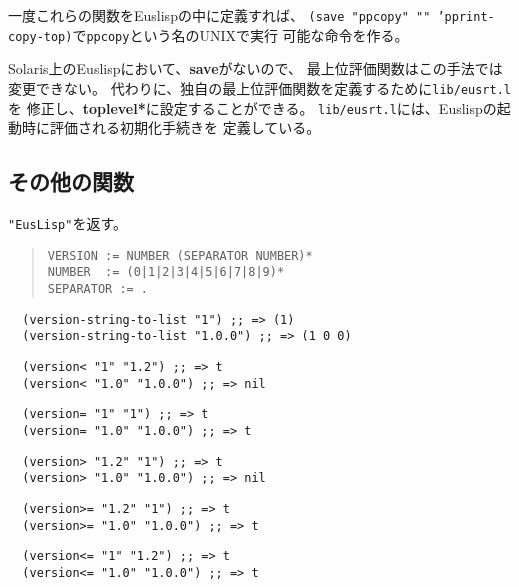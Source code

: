 一度これらの関数をEuslispの中に定義すれば、
{\tt (save "ppcopy" "" 'pprint-copy-top)}で{\tt ppcopy}という名のUNIXで実行
可能な命令を作る。

Solaris上のEuslispにおいて、{\bf save}がないので、
最上位評価関数はこの手法では変更できない。
代わりに、独自の最上位評価関数を定義するために{\tt lib/eusrt.l}を
修正し、{\bf *toplevel*}に設定することができる。
{\tt lib/eusrt.l}には、Euslispの起動時に評価される初期化手続きを
定義している。

\subsection{その他の関数}
\begin{refdesc}
{{\tt "EusLisp"}を返す。}
\begin{quote}
\begin{verbatim}
VERSION := NUMBER (SEPARATOR NUMBER)*
NUMBER  := (0|1|2|3|4|5|6|7|8|9)*
SEPARATOR := .
\end{verbatim}
\end{quote}
\begin{verbatim}
  (version-string-to-list "1") ;; => (1)
  (version-string-to-list "1.0.0") ;; => (1 0 0)
\end{verbatim}
\begin{verbatim}
  (version< "1" "1.2") ;; => t
  (version< "1.0" "1.0.0") ;; => nil
\end{verbatim}
\begin{verbatim}
  (version= "1" "1") ;; => t
  (version= "1.0" "1.0.0") ;; => t
\end{verbatim}
\begin{verbatim}
  (version> "1.2" "1") ;; => t
  (version> "1.0" "1.0.0") ;; => nil
\end{verbatim}
\begin{verbatim}
  (version>= "1.2" "1") ;; => t
  (version>= "1.0" "1.0.0") ;; => t
\end{verbatim}
\begin{verbatim}
  (version<= "1" "1.2") ;; => t
  (version<= "1.0" "1.0.0") ;; => t
\end{verbatim}
\end{refdesc}

\newpage
